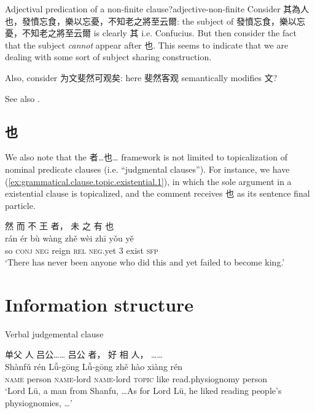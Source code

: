 \documentclass[UTF8, a4paper, oneside, scheme=plain, 12pt]{ctexrep}
\newcommand{\translate}[1]{`#1'}
\newcommand*{\category}[1]{\textsc{#1}}
\begin{document}
\begin{todobox}{Adjectival predication of a non-finite clause?}{adjective-non-finite}
    Consider 其為人也，發憤忘食，樂以忘憂，不知老之將至云爾:
    the subject of 發憤忘食，樂以忘憂，不知老之將至云爾 is clearly 其 i.e. Confucius.
    But then consider the fact that the subject \emph{cannot} appear after 也.
    This seems to indicate that we are dealing with some sort of subject sharing construction.

    Also, consider 为文斐然可观矣: here 斐然客观 semantically modifies 文?

    See also .
\end{todobox}

\section{也}

We also note that the 者…也… framework is not limited to topicalization of nominal predicate clauses
(i.e. ``judgmental clauses'').
For instance, we have (\ref{ex:grammatical.clause.topic.existential.1}),
in which the sole argument in a existential clause is topicalized,
and the comment receives 也 as its sentence final particle.

\begin{exe}
    \ex\label{ex:grammatical.clause.topic.existential.1}
    \glll 然 而 不 王 者， 未 之 有 也 \\
    rán ér bù wàng zhě wèi zhī yǒu yě \\
    so \category{conj} \category{neg} reign \category{rel} \category{neg}.yet 3 exist \category{sfp} \\
    \glt\translate{There has never been anyone who did this and yet failed to become king.}
\end{exe}

\chapter{Information structure}

Verbal judgemental clause

\begin{exe}
    \ex\label{ex:grammatical.clause.topic.2}
    \glll 单父 人 吕公…… 吕公 者， 好 相 人， …… \\
    Shànfǔ rén Lǚ-gōng Lǚ-gōng zhě hào xiàng rén {} \\
    \category{name} person \category{name}-lord \category{name}-lord \category{topic} like read.physiognomy person {} \\
    \glt\translate{Lord Lü, a man from Shanfu, \dots As for Lord Lü, he liked reading people's physiognomies, \dots}
\end{exe}
\end{document}

